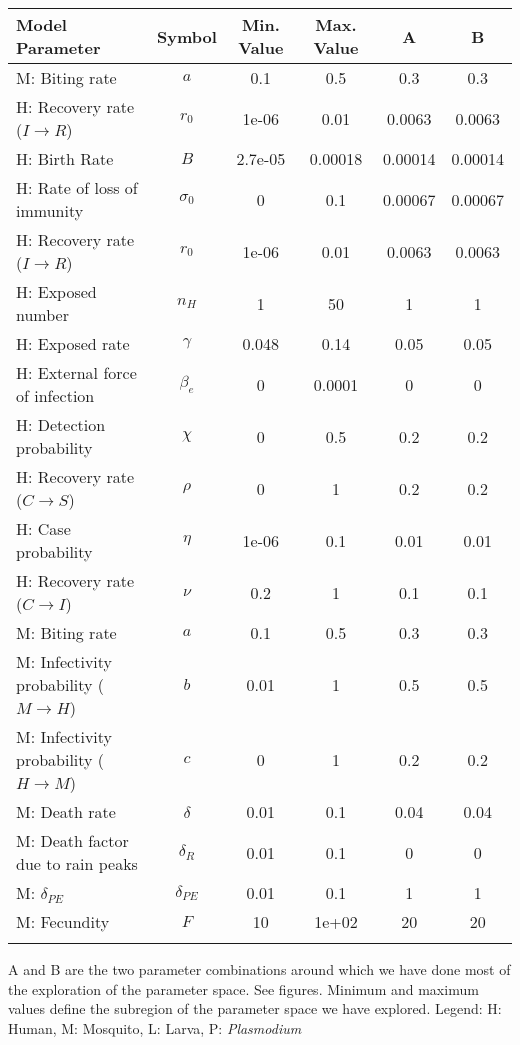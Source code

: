 \begin{table}
\noindent
\begin{tabular}{p{5cm}ccccc}
{\bf Model Parameter} & {\bf Symbol} & {\bf Min. Value} & {\bf Max. Value} & {\bf A} & {\bf B}\\
\hline\hline
  M: Biting rate & $a$ &  0.1 &  0.5 &  0.3 &  0.3\\
  H: Recovery rate ($I \rightarrow R$) & $r_0$ & 1e-06 & 0.01 & 0.0063 & 0.0063\\
  H: Birth Rate & $B$ & 2.7e-05 & 0.00018 & 0.00014 & 0.00014\\
  H: Rate of loss of immunity & $\sigma_0$ &    0 &  0.1 & 0.00067 & 0.00067\\
  H: Recovery rate ($I \rightarrow R$) & $r_0$ & 1e-06 & 0.01 & 0.0063 & 0.0063\\
  H: Exposed number & $n_H$ &    1 &   50 &    1 &    1\\
  H: Exposed rate & $\gamma$ & 0.048 & 0.14 & 0.05 & 0.05\\
  H: External force of infection & $\beta_e$ &    0 & 0.0001 &    0 &    0\\
  H: Detection probability & $\chi$ &    0 &  0.5 &  0.2 &  0.2\\
  H: Recovery rate ($C \rightarrow S$) & $\rho$ &    0 &    1 &  0.2 &  0.2\\
  H: Case probability & $\eta$ & 1e-06 &  0.1 & 0.01 & 0.01\\
  H: Recovery rate ($C \rightarrow I$) & $\nu$ &  0.2 &    1 &  0.1 &  0.1\\
  M: Biting rate & $a$ &  0.1 &  0.5 &  0.3 &  0.3\\
  M: Infectivity probability ($M \rightarrow H$) & $b$ & 0.01 &    1 &  0.5 &  0.5\\
  M: Infectivity probability ($H \rightarrow M$) & $c$ &    0 &    1 &  0.2 &  0.2\\
  M: Death rate & $\delta$ & 0.01 &  0.1 & 0.04 & 0.04\\
  M: Death factor due to rain peaks & $\delta_R$ & 0.01 &  0.1 &    0 &    0\\
  M: $\delta_{PE}$ & $\delta_{PE}$ & 0.01 &  0.1 &    1 &    1\\
  M: Fecundity & $F$ &   10 & 1e+02 &   20 &   20\\
\hline\hline
\smallskip
\end{tabular}
 A and B are the two parameter combinations around which we have done most of the exploration of the parameter space. See figures. Minimum and maximum values define the subregion of the parameter space we have explored. Legend: {\small H: Human, M: Mosquito, L: Larva, P: {\em Plasmodium}} 
\end{table}
